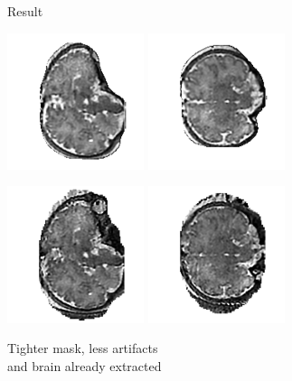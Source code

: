 \documentclass[12pt]{beamer}
\begin{document}
\begin{frame}{Result}

\centering

 \includegraphics[clip=true, trim=90 0 45 0,angle=-90,width=0.3\textwidth]{white_2628_maskingXZ.png}
 \includegraphics[clip=true, trim=90 0 45 0,angle=-90,width=0.3\textwidth]{white_2628_maskingXY.png}

 \includegraphics[clip=true, trim=35 0 25 0,angle=-90,width=0.3\textwidth]{white_2628_nomaskingXZ.png}
 \includegraphics[clip=true, trim=35 0 25 0,angle=-90,width=0.3\textwidth]{white_2628_nomaskingXY.png}

Tighter mask, less artifacts\\
 and brain already extracted

\end{frame}
\end{document}

